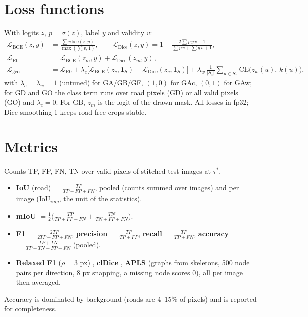 \documentclass[11pt]{article}
\begin{document}
\section{Loss functions}
\label{sec:loss}

With logits $z$, $p=\sigma(z)$, label $y$ and validity $v$:
\begin{align}
\mathcal L_{\mathrm{BCE}}(z,y) &= \frac{\sum v\,\mathrm{bce}(z,y)}{\max(\sum v,1)}, \qquad
\mathcal L_{\mathrm{Dice}}(z,y) = 1 - \frac{2\sum p\,y\,v + 1}{\sum p\,v + \sum y\,v + 1},\\
\mathcal L_{\mathrm{R0}} &= \mathcal L_{\mathrm{BCE}}(z_m,y) + \mathcal L_{\mathrm{Dice}}(z_m,y),\\
\mathcal L_{\mathrm{geo}} &= \mathcal L_{\mathrm{R0}} + \lambda_c\big[\mathcal L_{\mathrm{BCE}}(z_c,\mathbf 1_S)+\mathcal L_{\mathrm{Dice}}(z_c,\mathbf 1_S)\big]
  + \lambda_w\,\frac{1}{|S_v|}\sum_{u\in S_v}\mathrm{CE}\big(z_w(u),\,k(u)\big),
\end{align}
with $\lambda_c=\lambda_w=1$ (untuned) for GA/GB/GF, $(1,0)$ for GAc, $(0,1)$ for GAw; for GD and GO the
class term runs over road pixels (GD) or all valid pixels (GO) and $\lambda_c=0$. For GB, $z_m$ is the
logit of the drawn mask. All losses in fp32; Dice smoothing 1 keeps road-free crops stable.

\section{Metrics}
\label{sec:metrics}

Counts TP, FP, FN, TN over valid pixels of stitched test images at $\tau^\ast$.
\begin{itemize}
  \item \textbf{IoU} (road) $=\frac{TP}{TP+FP+FN}$, pooled (counts summed over images) and per image
        (IoU$_{img}$, the unit of the statistics).
  \item \textbf{mIoU} $=\frac12\big(\frac{TP}{TP+FP+FN}+\frac{TN}{TN+FP+FN}\big)$.
  \item \textbf{F1} $=\frac{2TP}{2TP+FP+FN}$, \textbf{precision} $=\frac{TP}{TP+FP}$,
        \textbf{recall} $=\frac{TP}{TP+FN}$, \textbf{accuracy} $=\frac{TP+TN}{TP+TN+FP+FN}$ (pooled).
  \item \textbf{Relaxed F1} ($\rho=3$ px) \cite{mnih2010}, \textbf{clDice} \cite{shit2021},
        \textbf{APLS} \cite{vanetten2018} (graphs from skeletons, 500 node pairs per direction, 8 px
        snapping, a missing node scores 0), all per image then averaged.
\end{itemize}
Accuracy is dominated by background (roads are 4--15\% of pixels) and is reported for completeness.
\end{document}
